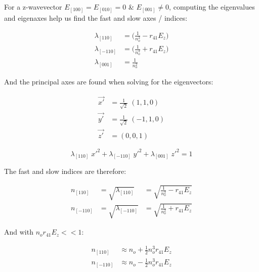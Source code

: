 \noindent For a z-wavevector $E_{[100]} = E_{[010]} = 0$ \& $E_{[001]} \neq 0$, computing the eigenvalues and eigenaxes help us find the fast and slow axes / indices:

\begin{equation}
    \begin{aligned}
	\lambda_{[110]} & = \big( \frac{1}{n_o ^2} - r_{41} E_z \big) \\
        \lambda_{[-110]} & = \big( \frac{1}{n_o ^2} + r_{41} E_z \big) \\
	\lambda_{[001]} &  = \frac{1}{n_o ^2}
    \end{aligned}
\end{equation}

\noindent And the principal axes are found when solving for the eigenvectors:

\begin{equation}
    \begin{aligned}
	\vec{x'} & = \frac{1}{\sqrt{2}}\;(1, 1, 0) \\
	\vec{y'} & = \frac{1}{\sqrt{2}}\;(-1, 1, 0) \\ 
	\vec{z'} & = (0, 0, 1)
    \end{aligned}
\end{equation}

\begin{equation}
    \lambda_{[110]}\; x'^2 + \lambda_{[-110]}\; y'^2 + \lambda_{[001]}\; z'^2 =1
\end{equation}


\noindent The fast and slow indices are therefore:

\begin{equation}
    \begin{aligned}
	n_{[110]} & = \sqrt{\lambda_{[110]}} & = \sqrt{\frac{1}{n_o ^2} - r_{41} E_z} \\
	n_{[-110]} & = \sqrt{\lambda_{[-110]}} & =  \sqrt{\frac{1}{n_o ^2} + r_{41} E_z}
    \end{aligned}
\end{equation}

\noindent And with $n_o r_{41} E_z << 1$:

\begin{equation}
    \begin{aligned}
	n_{[110]} & \approx  n_o + \frac{1}{2} n_o^3 r_{41} E_z \\
	n_{[-110]} & \approx n_o - \frac{1}{2} n_o^3 r_{41} E_z    
    \end{aligned}
\end{equation}




